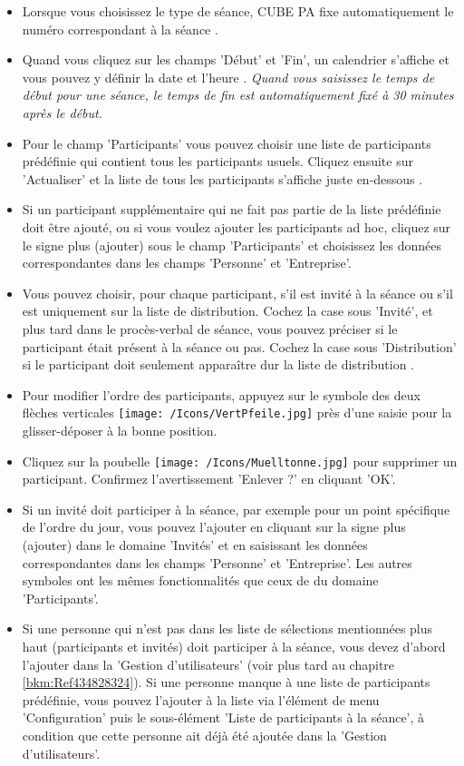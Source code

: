 \begin{itemize}
\item 
Lorsque vous choisissez le type de séance, CUBE PA fixe automatiquement le numéro correspondant à la séance .
\item 
Quand vous cliquez sur les champs 'Début' et 'Fin', un calendrier s'affiche et vous pouvez y définir la date et l'heure . \textit{Quand vous saisissez le temps de début pour une séance, le temps de fin est automatiquement fixé à 30 minutes après le début.}
\item 
Pour le champ 'Participants' vous pouvez choisir une liste de participants prédéfinie  qui contient tous les participants usuels. Cliquez ensuite sur 'Actualiser'  et la liste de tous les participants s'affiche juste en-dessous .
\item 
Si un participant supplémentaire qui ne fait pas partie de la liste prédéfinie doit être ajouté, ou  si vous voulez ajouter les participants ad hoc, cliquez sur le signe plus (ajouter) sous le champ 'Participants'  et choisissez les données correspondantes dans les champs 'Personne' et 'Entreprise'. 
\item
Vous pouvez choisir, pour chaque participant, s'il est invité à la séance ou s'il est uniquement sur la liste de distribution. Cochez la case  sous 'Invité', et plus tard dans le procès-verbal de séance, vous pouvez préciser si le participant était présent à la séance ou pas. Cochez la case sous 'Distribution' si le participant doit seulement apparaître dur la liste de distribution .
\item 
Pour modifier l'ordre des participants, appuyez sur le symbole des deux flèches verticales \texttt{[image: /Icons/VertPfeile.jpg]}  près d'une saisie pour la glisser-déposer à la bonne position.
\item 
Cliquez sur la poubelle \texttt{[image: /Icons/Muelltonne.jpg]}  pour supprimer un participant. Confirmez l'avertissement 'Enlever ?' en cliquant 'OK'.
\item 
Si un invité doit participer à la séance, par exemple pour un point spécifique de l'ordre du jour, vous pouvez l'ajouter en cliquant sur la signe plus (ajouter) dans le domaine 'Invités' et en saisissant les données correspondantes dans les champs 'Personne' et 'Entreprise'. Les autres symboles ont les mêmes fonctionnalités que ceux de du domaine 'Participants'.
\item 
Si une personne qui n'est pas dans les liste de sélections mentionnées plus haut (participants et invités) doit participer à la séance, vous devez d'abord l'ajouter dans la 'Gestion d'utilisateurs' (voir plus tard au chapitre \ref{bkm:Ref434828324}). Si une personne manque à une liste de participants prédéfinie, vous pouvez l'ajouter à la liste via l'élément de menu 'Configuration' puis le sous-élément 'Liste de participants à la séance', à condition que cette personne ait déjà été ajoutée dans la 'Gestion d'utilisateurs'.
\end{itemize}

